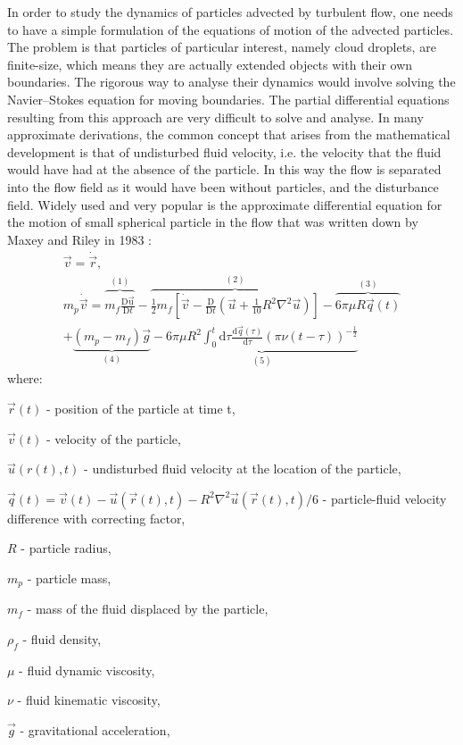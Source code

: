 \documentclass[../main.tex]{subfiles}
\begin{document}
In order to study the dynamics of particles advected by turbulent flow, one needs to have a simple formulation of the equations of motion of the advected particles. The problem is that particles of particular interest, namely cloud droplets, are finite-size, which means they are actually extended objects with their own boundaries. The rigorous way to analyse their dynamics would involve solving the Navier–Stokes equation for moving boundaries. The partial differential equations resulting from this approach are very difficult to solve and analyse. In many approximate derivations, the common concept that arises from the mathematical development is that of undisturbed fluid velocity, i.e. the velocity that the fluid would have had at the absence of the particle. In this way the flow is separated into the flow field as it would have been without particles, and the disturbance field. Widely used and very popular is the approximate differential equation for the motion of small spherical particle in the flow that was written down by Maxey and Riley in 1983 \citep{Maxey1983}:
\begin{align}
\vec{v}=\dot{\vec{r}},\\
m_p \dot{\vec{v}}=\overbrace{m_f \frac{\mathrm{D \vec{u}}}{\mathrm{D}t}}^{(1)} -\overbrace{ \frac{1}{2} m_f \left[\dot{\vec{v}}- \frac{\mathrm{D }}{\mathrm{D}t} \left( \vec{u}+\frac{1}{10} R^2 \nabla^2 \vec{u}\right) \right]}^{(2)} -\overbrace{6 \pi \mu R  \vec{q}(t)}^{(3)}\\
\nonumber +\underbrace{\left(m_p-m_f\right)\vec{g}}_{(4)} -\underbrace{6 \pi \mu R^2  \int_{0}^{t} \mathrm{d}\tau \frac{\mathrm{d}\vec{q}(\tau)}{\mathrm{d}\tau} (\pi \nu \left(t-\tau\right))^{-\frac{1}{2}}}_{(5)}
\label{ch1:eq02}
\end{align}
where:
\begin{description}
\item $\vec{r}(t)$ - position of the particle at time t,
\item $\vec{v}(t)$ - velocity of the particle,
\item $\vec{u}(r(t),t)$ - undisturbed fluid velocity at the location of the particle,
\item $\vec{q}(t)=\vec{v}(t)-\vec{u}(\vec{r}(t),t)-R^2\nabla^2\vec{u}(\vec{r}(t),t)/6$ - particle-fluid velocity difference with correcting factor,
\item $R$ - particle radius,
\item $m_p$ - particle mass,
\item $m_f$ - mass of the fluid displaced by the particle,
\item $\rho_f$ - fluid density,
\item $\mu$ - fluid dynamic viscosity, 
\item $\nu$ - fluid kinematic viscosity,
\item $\vec{g}$ - gravitational acceleration,
\end{description}
\end{document}
